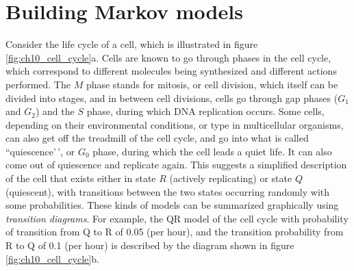 \documentclass[
]{book}
\theoremstyle{definition}
\theoremstyle{definition}
\theoremstyle{definition}
\theoremstyle{remark}
\begin{document}
\hypertarget{building-markov-models}{%
\section{Building Markov models}\label{building-markov-models}}

\label{sec:model10}

Consider the life cycle of a cell, which is illustrated in figure \ref{fig:ch10_cell_cycle}a. Cells are known to go through phases in the cell cycle, which correspond to different molecules being synthesized and different actions performed. The \(M\) phase stands for mitosis, or cell division, which itself can be divided into stages, and in between cell divisions, cells go through gap phases (\(G_1\) and \(G_2\)) and the \(S\) phase, during which DNA replication occurs. Some cells, depending on their environmental conditions, or type in multicellular organisms, can also get off the treadmill of the cell cycle, and go into what is called ``quiescence'\,', or \(G_0\) phase, during which the cell leads a quiet life. It can also come out of quiescence and replicate again. This suggests a simplified description of the cell that exists either in state \(R\) (actively replicating) or state \(Q\) (quiescent), with transitions between the two states occurring randomly with some probabilities. These kinds of models can be summarized graphically using \emph{transition diagrams}. For example, the QR model of the cell cycle with probability of transition from Q to R of 0.05 (per hour), and the transition probability from R to Q of 0.1 (per hour) is described by the diagram shown in figure \ref{fig:ch10_cell_cycle}b.
\end{document}
